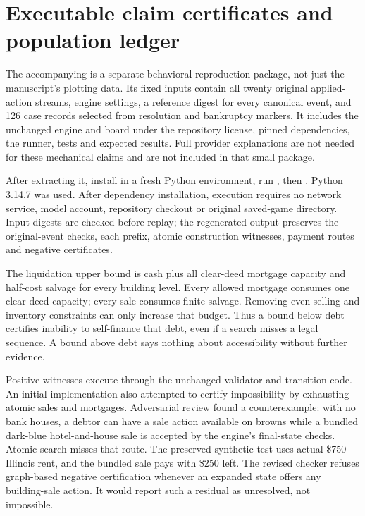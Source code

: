 \section{Executable claim certificates and population ledger}
\label{app:certificates}

The accompanying  is a separate behavioral reproduction package, not just the manuscript's plotting data. Its fixed inputs contain all twenty original applied-action streams, engine settings, a reference digest for every canonical event, and 126 case records selected from resolution and bankruptcy markers. It includes the unchanged engine and board under the repository license, pinned dependencies, the runner, tests and expected results. Full provider explanations are not needed for these mechanical claims and are not included in that small package.

After extracting it, install  in a fresh Python environment, run , then . Python 3.14.7 was used. After dependency installation, execution requires no network service, model account, repository checkout or original saved-game directory. Input digests are checked before replay; the regenerated output preserves the original-event checks, each prefix, atomic construction witnesses, payment routes and negative certificates.

The liquidation upper bound is cash plus all clear-deed mortgage capacity and half-cost salvage for every building level. Every allowed mortgage consumes one clear-deed capacity; every sale consumes finite salvage. Removing even-selling and inventory constraints can only increase that budget. Thus a bound below debt certifies inability to self-finance that debt, even if a search misses a legal sequence. A bound above debt says nothing about accessibility without further evidence.

Positive witnesses execute through the unchanged validator and transition code. An initial implementation also attempted to certify impossibility by exhausting atomic sales and mortgages. Adversarial review found a counterexample: with no bank houses, a debtor can have a sale action available on browns while a bundled dark-blue hotel-and-house sale is accepted by the engine's final-state checks. Atomic search misses that route. The preserved synthetic test uses actual \$750 Illinois rent, and the bundled sale pays with \$250 left. The revised checker refuses graph-based negative certification whenever an expanded state offers any building-sale action. It would report such a residual as unresolved, not impossible.

